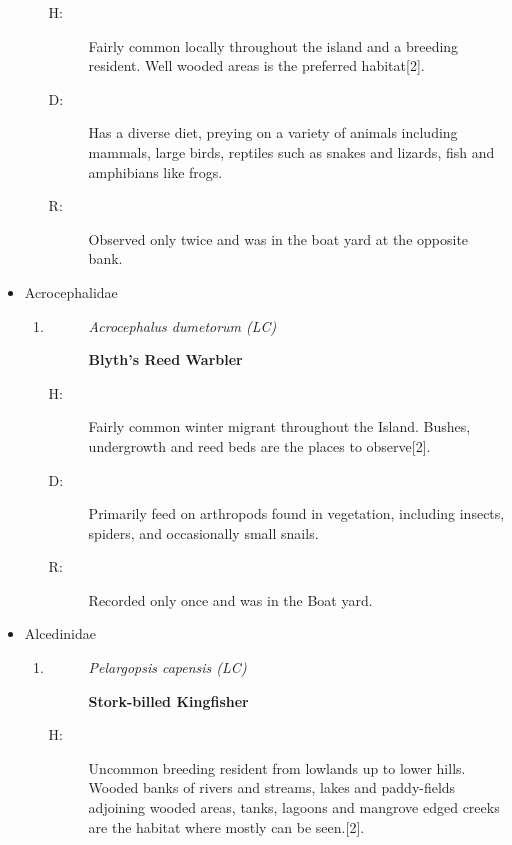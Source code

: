 \begin{itemize}
\begin{enumerate}
\begin{description}
\end{description}%
\begin{description}%
\item[H: ]%
Fairly common locally throughout the island and a breeding resident. Well wooded areas is the preferred habitat{[}2{]}.%
\item[D: ]%
Has a diverse diet, preying on a variety of animals including mammals, large birds, reptiles such as snakes and lizards, fish and amphibians like frogs.%
\item[R: ]%
Observed only twice and was in the boat yard at the opposite bank.%
\end{description}%
\end{enumerate}%
\item%
Acrocephalidae%
\begin{enumerate}%
\item%
\begin{description}%
\item[]%
\textit{Acrocephalus dumetorum (LC)}%
\item[]%
\textbf{Blyth's Reed Warbler}%
\end{description}%
\begin{description}%
\item[H: ]%
Fairly common winter migrant throughout the Island. Bushes, undergrowth and reed beds are the places to observe{[}2{]}.%
\item[D: ]%
Primarily feed on arthropods found in vegetation, including insects, spiders, and occasionally small snails.%
\item[R: ]%
Recorded only once and was in the Boat yard.%
\end{description}%
\end{enumerate}%
\item%
Alcedinidae%
\begin{enumerate}%
\item%
\begin{description}%
\item[]%
\textit{Pelargopsis capensis (LC)}%
\item[]%
\textbf{Stork{-}billed Kingfisher}%
\end{description}%
\begin{description}%
\item[H: ]%
Uncommon breeding resident from lowlands up to lower hills. Wooded banks of rivers and streams, lakes and paddy-fields adjoining wooded areas, tanks, lagoons and mangrove edged creeks are the habitat where mostly can be seen.{[}2{]}.%

\end{description}
\end{enumerate}
\end{itemize}
